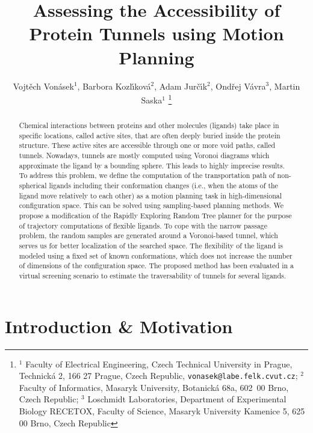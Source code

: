 \documentclass[usletter, 10pt, conference]{ieeeconf} %
\title{Assessing the Accessibility of Protein Tunnels using Motion Planning}
\author{Vojt\v ech Von\' asek$^{1}$,
    Barbora Kozl\'\i kov\'a$^{2}$,
    Adam Jur\v{c}\'\i k$^{2}$,
    Ond\v{r}ej V\'{a}vra$^{3}$,
    Martin Saska$^{1}$
\thanks{$^{1}$ Faculty of Electrical Engineering,  Czech Technical University in Prague, 
Technick\'a 2, 166 27 Prague, Czech Republic, {\tt vonasek@labe.felk.cvut.cz};
$^{2}$ Faculty of Informatics, Masaryk University, Botanick\'a 68a, 602~00 Brno, Czech Republic;
$^{3}$ Loschmidt Laboratories, Department of Experimental Biology RECETOX, Faculty of Science, Masaryk University
    Kamenice 5, 625 00 Brno, Czech Republic}
    }
\begin{document}
\maketitle
\thispagestyle{empty}
\pagestyle{empty}

\begin{abstract}
Chemical interactions between proteins and other molecules (ligands) take place in specific locations, called active sites, that are often deeply buried inside the protein structure.
These active sites are accessible through one or more void paths, called tunnels.
Nowadays, tunnels are mostly computed using Voronoi diagrams which approximate the ligand by a bounding sphere.
This leads to highly imprecise results.
To address this problem, we define the computation of the transportation path of non-spherical ligands including their conformation changes (i.e., when the atoms of the ligand move relatively to each other) as a motion planning task in high-dimensional configuration space.
This can be solved using sampling-based planning methods.
We propose a modification of the Rapidly Exploring Random Tree planner for the purpose of trajectory computations of flexible ligands.
To cope with the narrow passage problem, the random samples are generated around a Voronoi-based tunnel, which serves us for better localization of the searched space.
The flexibility of the ligand is modeled using a fixed set of known conformations, which does not increase the number of dimensions of the configuration space.
The proposed method has been evaluated in a virtual screening scenario to estimate the traversability of tunnels for several ligands.
\end{abstract}


\section{Introduction \& Motivation}
\end{document}
